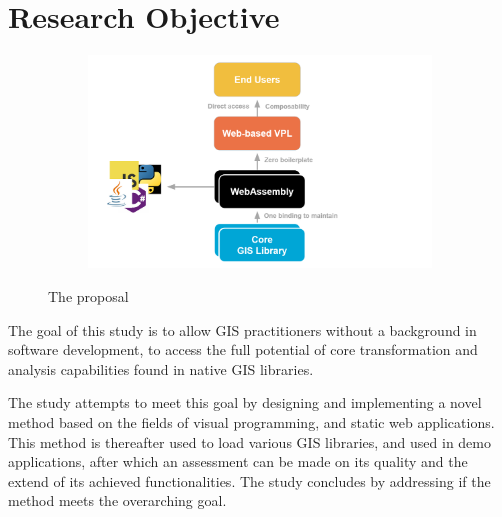 \section{Research Objective}

\graphicspath{{../../assets/images/1/}}

\begin{figure}
  \centering
  \begin{subfigure}[b]{0.80\linewidth}
    \centering
    \includegraphics[width=\linewidth]{proposal.png}
  \end{subfigure}%
  \caption{The proposal}
  \label{fig:proposal}
\end{figure}

The goal of this study is to allow \ac{GIS} practitioners without a background in software development, to access the full potential of core transformation and analysis capabilities found in native \ac{GIS} libraries.

The study attempts to meet this goal by designing and implementing a novel \\ method based on the fields of visual programming, and static web applications. 
This method is thereafter used to load various \ac{GIS} libraries, and used in demo applications, after which an assessment can be made on its quality and the extend of its achieved functionalities. 
The study concludes by addressing if the method meets the overarching goal.


